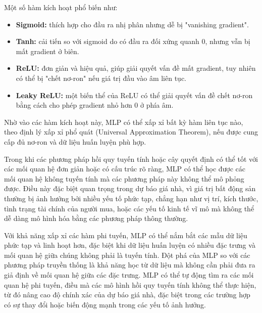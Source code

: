 Một số hàm kích hoạt phổ biến như:

\begin{itemize}
	\item \textbf{Sigmoid:} thích hợp cho đầu ra nhị phân nhưng dễ bị "vanishing gradient".
	\item \textbf{Tanh:} cải tiến so với sigmoid do có đầu ra đối xứng quanh 0, nhưng vẫn bị mất gradient ở biên.
	\item \textbf{ReLU:} đơn giản và hiệu quả, giúp giải quyết vấn đề mất gradient, tuy nhiên có thể bị "chết nơ-ron" nếu giá trị đầu vào âm liên tục.
	\item \textbf{Leaky ReLU:} một biến thể của ReLU có thể giải quyết vấn đề chết nơ-ron bằng cách cho phép gradient nhỏ hơn 0 ở phía âm.
\end{itemize}

Nhờ vào các hàm kích hoạt này, MLP có thể xấp xỉ bất kỳ hàm liên tục nào, theo định lý xấp xỉ phổ quát (Universal Approximation Theorem), nếu được cung cấp đủ nơ-ron và dữ liệu huấn luyện phù hợp.

Trong khi các phương pháp hồi quy tuyến tính hoặc cây quyết định có thể tốt với các mối quan hệ đơn giản hoặc có cấu trúc rõ ràng, MLP có thể học được các mối quan hệ không tuyến tính mà các phương pháp này không thể mô phỏng được. Điều này đặc biệt quan trọng trong dự báo giá nhà, vì giá trị bất động sản thường bị ảnh hưởng bởi nhiều yếu tố phức tạp, chẳng hạn như vị trí, kích thước, tình trạng tài chính của người mua, hoặc các yếu tố kinh tế vĩ mô mà không thể dễ dàng mô hình hóa bằng các phương pháp thông thường.

Với khả năng xấp xỉ các hàm phi tuyến, MLP có thể nắm bắt các mẫu dữ liệu phức tạp và linh hoạt hơn, đặc biệt khi dữ liệu huấn luyện có nhiều đặc trưng và mối quan hệ giữa chúng không phải là tuyến tính. Đột phá của MLP so với các phương pháp truyền thống là khả năng học từ dữ liệu mà không cần phải đưa ra giả định về mối quan hệ giữa các đặc trưng. MLP có thể tự động tìm ra các mối quan hệ phi tuyến, điều mà các mô hình hồi quy tuyến tính không thể thực hiện, từ đó nâng cao độ chính xác của dự báo giá nhà, đặc biệt trong các trường hợp có sự thay đổi hoặc biến động mạnh trong các yếu tố ảnh hưởng.
